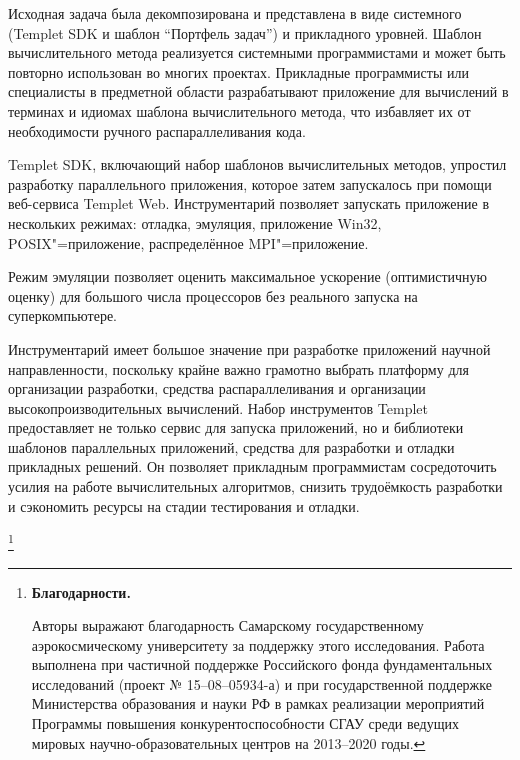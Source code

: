 Исходная задача была декомпозирована и представлена в виде системного (Templet SDK и шаблон ``Портфель задач'') и прикладного уровней. Шаблон вычислительного метода реализуется системными программистами и может быть повторно использован во многих проектах. Прикладные программисты или специалисты в предметной области разрабатывают приложение для вычислений в терминах и идиомах шаблона вычислительного метода, что избавляет их от необходимости ручного распараллеливания кода.



Templet SDK, включающий набор шаблонов вычислительных методов, упростил разработку параллельного приложения, которое затем запускалось при помощи веб-сервиса Templet Web. Инструментарий позволяет запускать приложение в нескольких режимах: отладка, эмуляция, приложение Win32, POSIX"=приложение, распределённое MPI"=приложение. 

Режим эмуляции позволяет оценить максимальное ускорение (оптимистичную оценку) для большого числа процессоров без реального запуска на суперкомпьютере.



\smallskip




Инструментарий имеет большое значение при разработке приложений научной направленности, поскольку крайне важно грамотно выбрать платформу для организации разработки, средства распараллеливания и организации высокопроизводительных вычислений. Набор инструментов Templet предоставляет не только сервис для запуска приложений, но и библиотеки шаблонов параллельных приложений, средства для разработки и отладки прикладных решений. Он позволяет прикладным программистам сосредоточить усилия на работе вычислительных алгоритмов, снизить трудоёмкость разработки и сэкономить ресурсы на стадии тестирования и отладки.











\thanks{\textbf{Благодарности.} 

Авторы выражают благодарность Самарскому государственному аэрокосмическому университету за поддержку этого исследования. Работа выполнена при частичной поддержке Российского фонда фундаментальных исследований (проект № 15--08--05934-а) и  при государственной поддержке Министерства образования и науки РФ в рамках реализации мероприятий Программы повышения конкурентоспособности СГАУ среди ведущих мировых научно-образовательных центров на 2013--2020 годы. 

}







